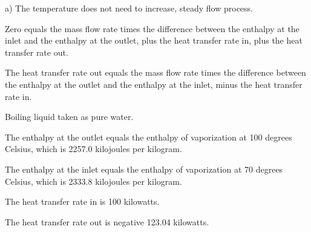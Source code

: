 a) The temperature does not need to increase, steady flow process.

Zero equals the mass flow rate times the difference between the enthalpy at the inlet and the enthalpy at the outlet, plus the heat transfer rate in, plus the heat transfer rate out.

The heat transfer rate out equals the mass flow rate times the difference between the enthalpy at the outlet and the enthalpy at the inlet, minus the heat transfer rate in.

Boiling liquid taken as pure water.

The enthalpy at the outlet equals the enthalpy of vaporization at 100 degrees Celsius, which is 2257.0 kilojoules per kilogram.

The enthalpy at the inlet equals the enthalpy of vaporization at 70 degrees Celsius, which is 2333.8 kilojoules per kilogram.

The heat transfer rate in is 100 kilowatts.

The heat transfer rate out is negative 123.04 kilowatts.